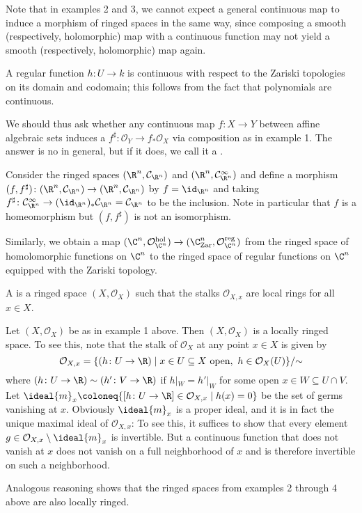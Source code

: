 \documentclass[wip, algebra]{bsteffan-lecturenotes}
\newcommand{\cO}{\mathcal{O}}
\newcommand{\cC}{\mathcal{C}}
\begin{document}
Note that in examples 2 and 3, we cannot expect a general continuous map to induce a morphism of ringed spaces in the same way, since composing a smooth (respectively, holomorphic) map with a continuous function may not yield a smooth (respectively, holomorphic) map again.
\begin{remark}
	A regular function $h\colon U \to k$ is continuous with respect to the Zariski topologies on its domain and codomain; this follows from the fact that polynomials are continuous.

	We should thus ask whether any continuous map $f\colon X \to Y$ between affine algebraic sets induces a $f^\sharp\colon \cO_Y \to f_* \cO_X$ via composition as in example 1.
	The answer is no in general, but if it does, we call it a .
\end{remark}
\begin{example}
	Consider the ringed spaces $(\R^n, \cC_{\R^n})$ and $(\R^n, \cC^\infty_{\R^n})$ and define a morphism $(f, f^\sharp)\colon (\R^n, \cC_{\R^n}) \to (\R^n, \cC_{\R^n})$ by $f = \id_{\R^n}$ and taking $f^\sharp\colon \cC^\infty_{\R^n} \to (\id_{\R^n})_* \cC_{\R^n} = \cC_{\R^n}$ to be the inclusion.
	Note in particular that $f$ is a homeomorphism but $(f, f^\sharp)$ is not an isomorphism.

	Similarly, we obtain a map $(\C^n, \cO^\mathrm{hol}_{\C^n}) \to (\C^n_{\mathrm{Zar}}, \cO^\mathrm{reg}_{\C^n})$ from the ringed space of homolomorphic functions on $\C^n$ to the ringed space of regular functions on $\C^n$ equipped with the Zariski topology.
\end{example}
\begin{definition}
	A  is a ringed space $(X, \cO_X)$ such that the stalks $\cO_{X, x}$ are local rings for all $x \in X$.
\end{definition}
\begin{example}
	Let $(X, \cO_X)$ be as in example 1 above.
	Then $(X, \cO_X)$ is a locally ringed space.
	To see this, note that the stalk of $\cO_X$ at any point $x \in X$ is given by
	\begin{equation*}
		\cO_{X, x} = \{(h\colon U \to \R) \mid x \in U \subseteq X \text{ open},\ h \in \cO_X(U)\} / {{\sim}}
	\end{equation*}
	where $(h\colon U \to \R) \sim (h'\colon V \to \R)$ if $h|_W = h'|_W$ for some open $x \in W \subseteq U \cap V$.
	Let $\ideal{m}_x \coloneq \{[h\colon U \to \R] \in \cO_{X, x} \mid h(x) = 0\}$ be the set of germs vanishing at $x$.
	Obviously $\ideal{m}_x$ is a proper ideal, and it is in fact the unique maximal ideal of $\cO_{X, x}$:
	To see this, it suffices to show that every element $g \in \cO_{X, x} \setminus \ideal{m}_x$ is invertible. 
	But a continuous function that does not vanish at $x$ does not vanish on a full neighborhood of $x$ and is therefore invertible on such a neighborhood.

	Analogous reasoning shows that the ringed spaces from examples 2 through 4 above are also locally ringed.
\end{example}
\end{document}
